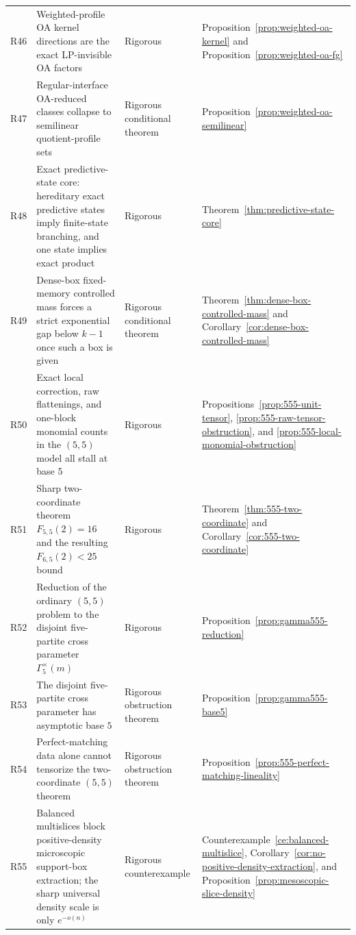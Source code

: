 \documentclass[11pt]{article}
\theoremstyle{definition}
\newcommand{\1}{\mathbf{1}}
\begin{document}
\begin{longtable}{p{}p{}p{}p{}}
R46 & Weighted-profile OA kernel directions are the exact LP-invisible OA factors & Rigorous & Proposition~\ref{prop:weighted-oa-kernel} and Proposition~\ref{prop:weighted-oa-fg}\\
R47 & Regular-interface OA-reduced classes collapse to semilinear quotient-profile sets & Rigorous conditional theorem & Proposition~\ref{prop:weighted-oa-semilinear}\\
R48 & Exact predictive-state core: hereditary exact predictive states imply finite-state branching, and one state implies exact product & Rigorous & Theorem~\ref{thm:predictive-state-core}\\
R49 & Dense-box fixed-memory controlled mass forces a strict exponential gap below $k-1$ once such a box is given & Rigorous conditional theorem & Theorem~\ref{thm:dense-box-controlled-mass} and Corollary~\ref{cor:dense-box-controlled-mass}\\
R50 & Exact local correction, raw flattenings, and one-block monomial counts in the $(5,5)$ model all stall at base $5$ & Rigorous & Propositions~\ref{prop:555-unit-tensor}, \ref{prop:555-raw-tensor-obstruction}, and \ref{prop:555-local-monomial-obstruction}\\
R51 & Sharp two-coordinate theorem $F_{5,5}(2)=16$ and the resulting $F_{6,5}(2)<25$ bound & Rigorous & Theorem~\ref{thm:555-two-coordinate} and Corollary~\ref{cor:555-two-coordinate}\\
R52 & Reduction of the ordinary $(5,5)$ problem to the disjoint five-partite cross parameter $\Gamma_{5}^{\times}(m)$ & Rigorous & Proposition~\ref{prop:gamma555-reduction}\\
R53 & The disjoint five-partite cross parameter has asymptotic base $5$ & Rigorous obstruction theorem & Proposition~\ref{prop:gamma555-base5}\\
R54 & Perfect-matching data alone cannot tensorize the two-coordinate $(5,5)$ theorem & Rigorous obstruction theorem & Proposition~\ref{prop:555-perfect-matching-lineality}\\
R55 & Balanced multislices block positive-density microscopic support-box extraction; the sharp universal density scale is only $e^{-o(n)}$ & Rigorous counterexample & Counterexample~\ref{ce:balanced-multislice}, Corollary~\ref{cor:no-positive-density-extraction}, and Proposition~\ref{prop:mesoscopic-slice-density}\\


\end{longtable}
\end{document}
